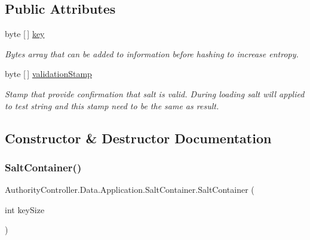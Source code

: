 \subsection*{Public Attributes}
\begin{DoxyCompactItemize}
\item 
byte \mbox{[}$\,$\mbox{]} \mbox{\hyperlink{class_authority_controller_1_1_data_1_1_application_1_1_salt_container_a0aaf05215aac85237a3fb02de5a55a44}{key}}
\begin{DoxyCompactList}\small\item\em Bytes array that can be added to information before hashing to increase entropy. \end{DoxyCompactList}\item 
byte \mbox{[}$\,$\mbox{]} \mbox{\hyperlink{class_authority_controller_1_1_data_1_1_application_1_1_salt_container_adcf2002c95427ded8b59046896b9c355}{validation\+Stamp}}
\begin{DoxyCompactList}\small\item\em Stamp that provide confirmation that salt is valid. During loading salt will applied to test string and this stamp need to be the same as result. \end{DoxyCompactList}\end{DoxyCompactItemize}


\subsection{Constructor \& Destructor Documentation}
\mbox{\label{class_authority_controller_1_1_data_1_1_application_1_1_salt_container_a0bbc5729faf6cdce0798360552359777}} 
\subsubsection{\texorpdfstring{Salt\+Container()}{SaltContainer()}}
{\footnotesize\ttfamily Authority\+Controller.\+Data.\+Application.\+Salt\+Container.\+Salt\+Container (\begin{DoxyParamCaption}\item[{int}]{key\+Size }\end{DoxyParamCaption})}




